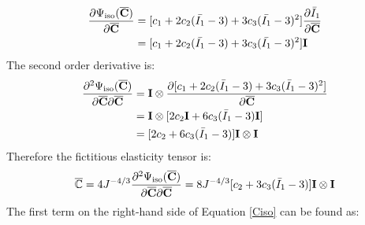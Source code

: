 \begin{equation}
\begin{split}
\frac{\partial{\Psi_\mathrm{iso}(\overline{\bold{C}})}}{\partial{\overline{\bold{C}}}} 
&= [c_1 + 2c_2(\bar{I_1} - 3) + 3c_3(\bar{I_1} - 3)^2] \frac{\partial{\bar{I}_1}}{\partial{\overline{\bold{C}}}} \\
&= [c_1 + 2c_2(\bar{I_1} - 3) + 3c_3(\bar{I_1} - 3)^2] \bold{I} 
\end{split}
\end{equation}
The second order derivative is:
\begin{equation}
\begin{split}
\frac{\partial^2\Psi_\mathrm{iso}(\overline{\bold{C}})}{\partial\overline{\bold{C}}\partial\overline{\bold{C}}} &= 
\bold{I} \otimes \frac{\partial[c_1 + 2c_2({\bar{I}}_1-3) + 3c_3({\bar{I}}_1-3)^2 ]}{\partial{\overline{\bold{C}}}} \\
&= \bold{I} \otimes [2c_2\bold{I} + 6c_3({\bar{I}}_1-3)\bold{I}]\\
&= [2c_2 + 6c_3({\bar{I}}_1-3)] \bold{I} \otimes \bold{I}
\end{split}
\end{equation}
Therefore the fictitious elasticity tensor is:
\begin{equation}
\overline{\mathbb{C}} = 4J^{-4/3}\frac{\partial^2\Psi_\mathrm{iso}(\overline{\bold{C}})}{\partial{\overline{\bold{C}}}{\partial{\overline{\bold{C}}}}} = 8J^{-4/3}[c_2 + 3c_3({\bar{I}}_1 - 3) ]\bold{I} \otimes \bold{I}
\end{equation}
The first term on the right-hand side of Equation \ref{Ciso} can be found as:

